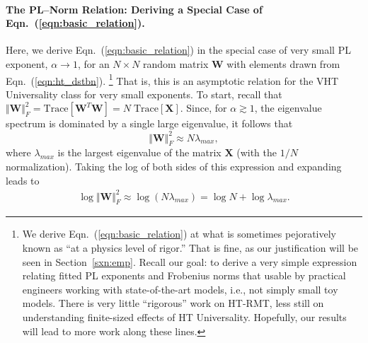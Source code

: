 

\paragraph{The PL--Norm Relation: Deriving a Special Case of Eqn.~(\ref{eqn:basic_relation}).}

Here, we derive Eqn.~(\ref{eqn:basic_relation}) in the special case of very small PL exponent, $\alpha \rightarrow 1$,
for an $N \times N$ random matrix $\mathbf{W}$ with elements drawn from Eqn.~(\ref{eqn:ht_dstbn}).%
\footnote{We derive Eqn.~(\ref{eqn:basic_relation}) at what is sometimes pejoratively known as ``at a physics level of rigor.''  That is fine, as our justification will be seen in Section~\ref{sxn:emp}.  Recall our goal: to derive a very simple expression relating fitted PL exponents and Frobenius norms that usable by practical engineers working with state-of-the-art models, i.e., not simply small toy models.  There is very little ``rigorous'' work on HT-RMT, less still on understanding finite-sized effects of HT Universality.  Hopefully, our results will lead to more work along these lines.  }
That is, this is an asymptotic relation for the VHT Universality class for very small exponents.
%
To start, recall that $ \Vert \mathbf{W}\Vert_{F}^{2}=\mbox{Trace}[\mathbf{W}^{T}\mathbf{W}]=N\;\mbox{Trace}[\mathbf{X}]$.
Since, for $\alpha \gtrsim 1$, the eigenvalue spectrum is dominated by a single large eigenvalue, it follows that
$$
\Vert \mathbf{W}\Vert_{F}^{2}\approx N\lambda_{max}  , 
$$
where $\lambda_{max}$ is the largest eigenvalue of the matrix $\mathbf{X}$ (with the $1/N$ normalization).
Taking the log of both sides of this expression and expanding leads to
\begin{eqnarray*}
\log\Vert \mathbf{W}\Vert_{F}^{2} 
   \approx \log \left( N\lambda_{max} \right) 
   =       \log N+\log\lambda_{max}  .
\end{eqnarray*}
